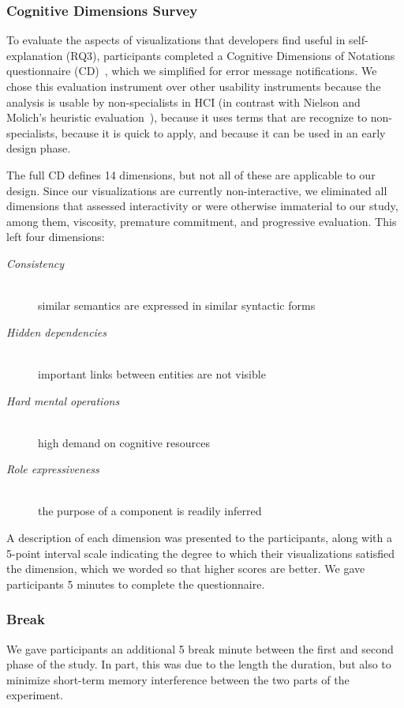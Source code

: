 \documentclass[conference]{IEEEtran}
\begin{document}
\subsubsection{Cognitive Dimensions Survey}
\label{subsec:cogdim}

To evaluate the aspects of visualizations that developers find useful in self-explanation (RQ3), participants completed a Cognitive Dimensions of Notations questionnaire (CD)~\cite{Green1996}, which we simplified for error message notifications. We chose this evaluation instrument over other usability instruments because the analysis is usable by non-specialists in HCI (in contrast with Nielson and Molich's heuristic evaluation~\cite{Nielsen1990}), because it uses terms that are recognize to non-specialists, because it is quick to apply, and because it can be used in an early design phase.

The full CD defines 14 dimensions, but not all of these are applicable to our design. Since our visualizations are currently non-interactive, we eliminated all dimensions that assessed interactivity or were otherwise immaterial to our study, among them, viscosity, premature commitment, and progressive evaluation. This left four dimensions:

\begin{description}
\item[\textit{Consistency}]\hfill\\ similar semantics are expressed in similar syntactic forms
\item[\textit{Hidden dependencies}]\hfill\\ important links between entities are not visible
\item[\textit{Hard mental operations}]\hfill\\ high demand on cognitive resources
\item[\textit{Role expressiveness}]\hfill\\ the purpose of a component is readily inferred
\end{description}

A description of each dimension was presented to the participants, along with a 5-point interval scale indicating the degree to which their visualizations satisfied the dimension, which we worded so that higher scores are better. We gave participants 5 minutes to complete the questionnaire.

\subsubsection{Break} We gave participants an additional 5 break minute between the first and second phase of the study. In part, this was due to the length the duration, but also to minimize short-term memory interference between the two parts of the experiment.
\end{document}
